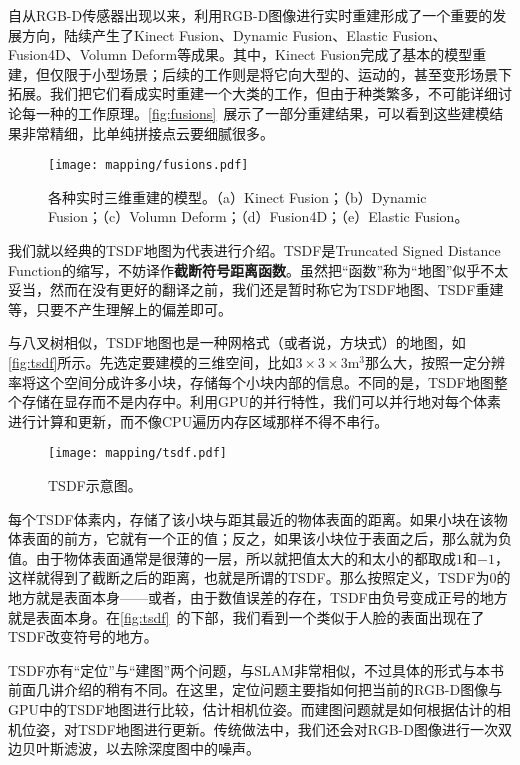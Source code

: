 自从RGB-D传感器出现以来，利用RGB-D图像进行实时重建形成了一个重要的发展方向，陆续产生了Kinect Fusion\textsuperscript{\cite{Newcombe2011}}、Dynamic Fusion\textsuperscript{\cite{Newcombe2015}}、Elastic Fusion\textsuperscript{\cite{Whelan2015}}、Fusion4D\textsuperscript{\cite{Dou2016}}、Volumn Deform\textsuperscript{\cite{Innmann2016}}等成果。其中，Kinect Fusion完成了基本的模型重建，但仅限于小型场景；后续的工作则是将它向大型的、运动的，甚至变形场景下拓展。我们把它们看成实时重建一个大类的工作，但由于种类繁多，不可能详细讨论每一种的工作原理。\autoref{fig:fusions}~展示了一部分重建结果，可以看到这些建模结果非常精细，比单纯拼接点云要细腻很多。

\begin{figure}[!htp]
	\centering
	\texttt{[image: mapping/fusions.pdf]}
	\caption{各种实时三维重建的模型。（a）Kinect Fusion；（b）Dynamic Fusion；（c）Volumn Deform；（d）Fusion4D；（e）Elastic Fusion。}
	\label{fig:fusions}
\end{figure}

我们就以经典的TSDF地图为代表进行介绍。TSDF是Truncated Signed Distance Function的缩写，不妨译作\textbf{截断符号距离函数}。虽然把“函数”称为“地图”似乎不太妥当，然而在没有更好的翻译之前，我们还是暂时称它为TSDF地图、TSDF重建等，只要不产生理解上的偏差即可。

与八叉树相似，TSDF地图也是一种网格式（或者说，方块式）的地图，如\autoref{fig:tsdf}所示。先选定要建模的三维空间，比如$3\times3\times3 \text{m}^3$那么大，按照一定分辨率将这个空间分成许多小块，存储每个小块内部的信息。不同的是，TSDF地图整个存储在显存而不是内存中。利用GPU的并行特性，我们可以并行地对每个体素进行计算和更新，而不像CPU遍历内存区域那样不得不串行。

\begin{figure}[!t]
	\centering
	\texttt{[image: mapping/tsdf.pdf]}
	\caption{TSDF示意图。}
	\label{fig:tsdf}
\end{figure}

每个TSDF体素内，存储了该小块与距其最近的物体表面的距离。如果小块在该物体表面的前方，它就有一个正的值；反之，如果该小块位于表面之后，那么就为负值。由于物体表面通常是很薄的一层，所以就把值太大的和太小的都取成$1$和$-1$，这样就得到了截断之后的距离，也就是所谓的TSDF。那么按照定义，TSDF为0的地方就是表面本身——或者，由于数值误差的存在，TSDF由负号变成正号的地方就是表面本身。在\autoref{fig:tsdf}~的下部，我们看到一个类似于人脸的表面出现在了TSDF改变符号的地方。

\enlargethispage{4pt}
TSDF亦有“定位”与“建图”两个问题，与SLAM非常相似，不过具体的形式与本书前面几讲介绍的稍有不同。在这里，定位问题主要指如何把当前的RGB-D图像与GPU中的TSDF地图进行比较，估计相机位姿。而建图问题就是如何根据估计的相机位姿，对TSDF地图进行更新。传统做法中，我们还会对RGB-D图像进行一次双边贝叶斯滤波，以去除深度图中的噪声。

